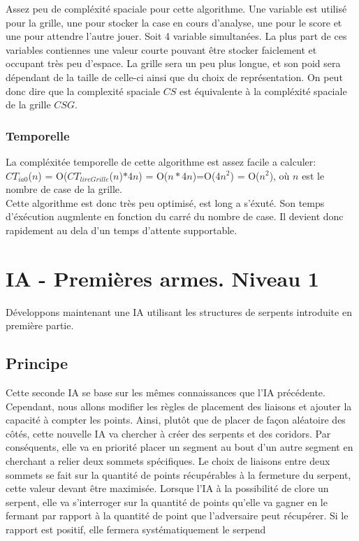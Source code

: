 \documentclass[a4paper,12pt]{report}
\begin{document}
Assez peu de compl\'exit\'e spaciale pour cette algorithme. Une variable est utilis\'e pour la grille, une pour stocker la case en cours d'analyse, une pour le score et une pour attendre l'autre jouer. Soit 4 variable simultan\'ees. La plus part de ces variables contiennes une valeur courte pouvant \^etre stocker faiclement et occupant tr\`es peu d'espace. La grille sera un peu plus longue, et son poid sera d\'ependant de la taille de celle-ci ainsi que du choix de repr\'esentation. On peut donc dire que la complexit\'e spaciale $CS$ est \'equivalente \`a la compl\'exit\'e spaciale de la grille $CSG$.

\subsubsection{Temporelle}

La compl\'exit\'ee temporelle de cette algorithme est assez facile a calculer: \\
$CT_{ia0}$($n$) = O($CT_{lireGrille}$($n$)$*$4$n$) = O($n*$4$n$)=O(4$n^2$) = O($n^2$), o\`u $n$ est le nombre de case de la grille. \\
Cette algorithme est donc tr\`es peu optimis\'e, est long a s'\'exut\'e. Son temps d'\'ex\'ecution augmlente en fonction du carr\'e du nombre de case. Il devient donc rapidement au dela d'un temps d'attente supportable.

\section{IA - Premi\`eres armes. Niveau 1}

D\'eveloppons maintenant une IA utilisant les structures de serpents introduite en premi\`ere partie. 

\subsection{Principe}

Cette seconde IA se base sur les m\^emes connaissances que l'IA pr\'ec\'edente. Cependant, nous allons modifier les r\`egles de placement des liaisons et ajouter la capacit\'e \`a compter les points. Ainsi, plut\^ot que de placer de fa\c{c}on al\'eatoire des c\^ot\'es, cette nouvelle IA va chercher \`a cr\'eer des serpents et des coridors. Par cons\'equents, elle va en priorit\'e placer un segment au bout d'un autre segment en cherchant a relier deux sommets sp\'ecifiques. Le choix de liaisons entre deux sommets se fait sur la quantit\'e de points r\'ecup\'erables \`a la fermeture du serpent, cette valeur devant \^etre maximis\'ee. Lorsque l'IA \`a la possibilit\'e de clore un serpent, elle va s'interroger sur la quantit\'e de points qu'elle va gagner en le fermant par rapport \`a la quantit\'e de point que l'adversaire peut r\'ecup\'erer. Si le rapport est positif, elle fermera syst\'ematiquement le serpend
\end{document}
